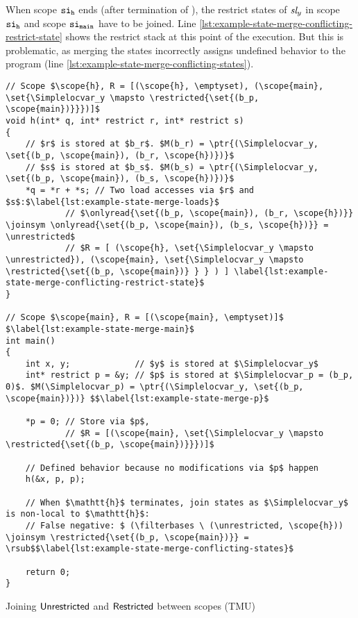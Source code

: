 When scope $\mathtt{si}_\mathtt{h}$ ends (after termination of ), the restrict states of $\textit{sl}_y$ in scope $\mathtt{si}_\mathtt{h}$ and scope $\mathtt{si}_\mathtt{main}$ have to be joined.
Line \ref{lst:example-state-merge-conflicting-restrict-state} shows the restrict stack at this point of the execution.
But this is problematic, as merging the states incorrectly assigns undefined behavior to the program (line \ref{lst:example-state-merge-conflicting-states}).

\begin{code}
\begin{verbatim}
// Scope $\scope{h}, R = [(\scope{h}, \emptyset), (\scope{main}, \set{\Simplelocvar_y \mapsto \restricted{\set{(b_p, \scope{main})}}})]$
void h(int* q, int* restrict r, int* restrict s)
{
    // $r$ is stored at $b_r$. $M(b_r) = \ptr{(\Simplelocvar_y, \set{(b_p, \scope{main}), (b_r, \scope{h})})}$
    // $s$ is stored at $b_s$. $M(b_s) = \ptr{(\Simplelocvar_y, \set{(b_p, \scope{main}), (b_s, \scope{h})})}$
    *q = *r + *s; // Two load accesses via $r$ and $s$:$\label{lst:example-state-merge-loads}$
            // $\onlyread{\set{(b_p, \scope{main}), (b_r, \scope{h})}} \joinsym \onlyread{\set{(b_p, \scope{main}), (b_s, \scope{h})}} = \unrestricted$
            // $R = [ (\scope{h}, \set{\Simplelocvar_y \mapsto \unrestricted}), (\scope{main}, \set{\Simplelocvar_y \mapsto \restricted{\set{(b_p, \scope{main})} } } ) ] \label{lst:example-state-merge-conflicting-restrict-state}$
}

// Scope $\scope{main}, R = [(\scope{main}, \emptyset)]$ $\label{lst:example-state-merge-main}$
int main()
{
    int x, y;             // $y$ is stored at $\Simplelocvar_y$
    int* restrict p = &y; // $p$ is stored at $\Simplelocvar_p = (b_p, 0)$. $M(\Simplelocvar_p) = \ptr{(\Simplelocvar_y, \set{(b_p, \scope{main})})} $$\label{lst:example-state-merge-p}$

    *p = 0; // Store via $p$,
            // $R = [(\scope{main}, \set{\Simplelocvar_y \mapsto \restricted{\set{(b_p, \scope{main})}}})]$

    // Defined behavior because no modifications via $p$ happen
    h(&x, p, p);

    // When $\mathtt{h}$ terminates, join states as $\Simplelocvar_y$ is non-local to $\mathtt{h}$:
    // False negative: $ (\filterbases \ (\unrestricted, \scope{h})) \joinsym \restricted{\set{(b_p, \scope{main})}} = \rsub$$\label{lst:example-state-merge-conflicting-states}$

    return 0;
}
\end{verbatim}
\caption{Joining $\mathsf{Unrestricted}$ and $\mathsf{Restricted}$ between scopes (TMU)}
\label{lst:example-merging-unrestricted-between-scopes}
\end{code}
\leavevmode

